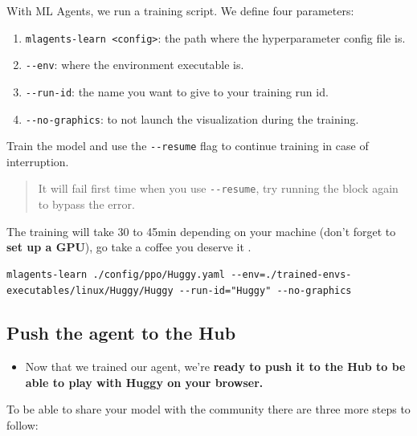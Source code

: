 \documentclass[11pt,a4paper]{article}
\begin{document}

With ML Agents, we run a training script. We define four parameters:

\begin{enumerate}
\def\labelenumi{\arabic{enumi}.}
\tightlist
\item
  \texttt{mlagents-learn\ \textless{}config\textgreater{}}: the path where the hyperparameter config file is.
\item
  \texttt{-\/-env}: where the environment executable is.
\item
  \texttt{-\/-run-id}: the name you want to give to your training run id.
\item
  \texttt{-\/-no-graphics}: to not launch the visualization during the training.
\end{enumerate}

Train the model and use the \texttt{-\/-resume} flag to continue training in case of interruption.

\begin{quote}
It will fail first time when you use \texttt{-\/-resume}, try running the block again to bypass the error.
\end{quote}

The training will take 30 to 45min depending on your machine (don't forget to \textbf{set up a GPU}), go take a coffee you deserve it .

\begin{lstlisting}
mlagents-learn ./config/ppo/Huggy.yaml --env=./trained-envs-executables/linux/Huggy/Huggy --run-id="Huggy" --no-graphics
\end{lstlisting}

\subsection{Push the agent to the Hub}\label{push-the-agent-to-the-hub}

\begin{itemize}
\tightlist
\item
  Now that we trained our agent, we're \textbf{ready to push it to the Hub to be able to play with Huggy on your browser.}
\end{itemize}

To be able to share your model with the community there are three more steps to follow:
\end{document}
